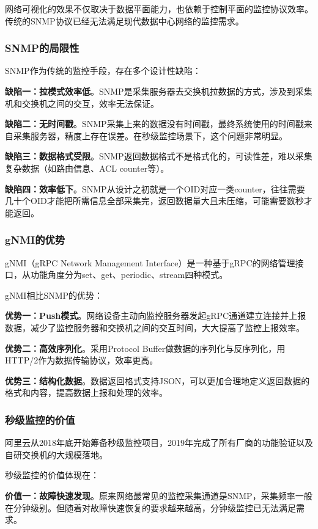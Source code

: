 网络可视化的效果不仅取决于数据平面能力，也依赖于控制平面的监控协议效率。传统的SNMP协议已经无法满足现代数据中心网络的监控需求。

\subsubsection{SNMP的局限性}

SNMP作为传统的监控手段，存在多个设计性缺陷：

\textbf{缺陷一：拉模式效率低}。SNMP是采集服务器去交换机拉数据的方式，涉及到采集机和交换机之间的交互，效率无法保证。

\textbf{缺陷二：无时间戳}。SNMP采集上来的数据没有时间戳，最终系统使用的时间戳来自采集服务器，精度上存在误差。在秒级监控场景下，这个问题非常明显。

\textbf{缺陷三：数据格式受限}。SNMP返回数据格式不是格式化的，可读性差，难以采集复杂数据（如路由信息、ACL counter等）。

\textbf{缺陷四：效率低下}。SNMP从设计之初就是一个OID对应一类counter，往往需要几十个OID才能把所需信息全部采集完，返回数据量大且未压缩，可能需要数秒才能返回。

\subsubsection{gNMI的优势}

gNMI（gRPC Network Management Interface）是一种基于gRPC的网络管理接口，从功能角度分为set、get、periodic、stream四种模式。

gNMI相比SNMP的优势：

\textbf{优势一：Push模式}。网络设备主动向监控服务器发起gRPC通道建立连接并上报数据，减少了监控服务器和交换机之间的交互时间，大大提高了监控上报效率。

\textbf{优势二：高效序列化}。采用Protocol Buffer做数据的序列化与反序列化，用HTTP/2作为数据传输协议，效率更高。

\textbf{优势三：结构化数据}。数据返回格式支持JSON，可以更加合理地定义返回数据的格式和内容，提高数据上报和处理的效率。

\subsubsection{秒级监控的价值}

阿里云从2018年底开始筹备秒级监控项目，2019年完成了所有厂商的功能验证以及自研交换机的大规模落地。

秒级监控的价值体现在：

\textbf{价值一：故障快速发现}。原来网络最常见的监控采集通道是SNMP，采集频率一般在分钟级别。但随着对故障快速恢复的要求越来越高，分钟级监控已无法满足需求。

